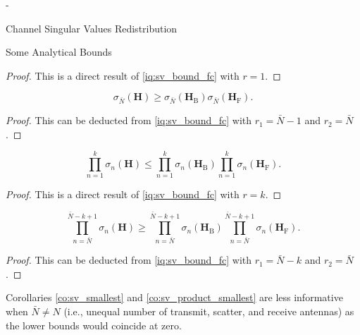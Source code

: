 \begin{section}{-}
\begin{subsection}{Channel Singular Values Redistribution}
\begin{subsubsection}{Some Analytical Bounds}
			\begin{proof}
				This is a direct result of \eqref{iq:sv_bound_fc} with $r = 1$.
			\end{proof}

			\begin{corollary}
				\begin{equation}
					\sigma_{\bar{N}}(\mathbf{H}) \ge \sigma_{\bar{N}}(\mathbf{H}_\mathrm{B}) \sigma_{\bar{N}}(\mathbf{H}_\mathrm{F}).
				\end{equation}
			\end{corollary}

			\begin{proof}
				This can be deducted from \eqref{iq:sv_bound_fc} with $r_1 = \bar{N}{-}1$ and $r_2 = \bar{N}$.
			\end{proof}

			\begin{corollary}
				\begin{equation}
					\prod_{n=1}^k \sigma_n(\mathbf{H}) \le \prod_{n=1}^k \sigma_n(\mathbf{H}_\mathrm{B}) \prod_{n=1}^k \sigma_n(\mathbf{H}_\mathrm{F}).
				\end{equation}
			\end{corollary}

			\begin{proof}
				This is a direct result of \eqref{iq:sv_bound_fc} with $r = k$.
			\end{proof}

			\begin{corollary}
				\begin{equation}
					\prod_{n=\bar{N}}^{\bar{N}-k+1} \sigma_n(\mathbf{H}) \ge \prod_{n=\bar{N}}^{\bar{N}-k+1} \sigma_n(\mathbf{H}_\mathrm{B}) \prod_{n=\bar{N}}^{\bar{N}-k+1} \sigma_n(\mathbf{H}_\mathrm{F}).
				\end{equation}
			\end{corollary}

			\begin{proof}
				This can be deducted from \eqref{iq:sv_bound_fc} with $r_1 = \bar{N}-k$ and $r_2 = \bar{N}$.
			\end{proof}

			Corollaries \ref{co:sv_smallest} and \ref{co:sv_product_smallest} are less informative when $\bar{N} \ne N$ (i.e., unequal number of transmit, scatter, and receive antennas) as the lower bounds would coincide at zero.


\end{subsubsection}
\end{subsection}
\end{section}
